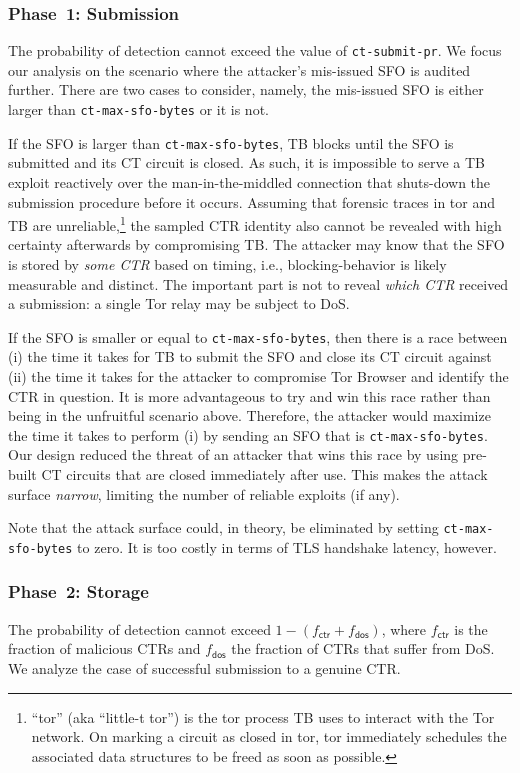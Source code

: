 \subsubsection{Phase~1: Submission} \label{sec:analysis:pr:phase1}
The probability of detection cannot exceed the value of \texttt{ct-submit-pr}.
We focus our analysis on the scenario where the
attacker's mis-issued SFO is audited further.  There are two cases to consider,
namely, the mis-issued SFO is either larger than \texttt{ct-max-sfo-bytes} or it
is not.

If the SFO is larger than \texttt{ct-max-sfo-bytes}, TB blocks until
the SFO is submitted and its CT circuit is closed.  As such, it is impossible to
serve a TB exploit reactively over the man-in-the-middled connection
that shuts-down the submission procedure before it occurs.  Assuming that
forensic traces in tor and TB are unreliable,\footnote{%
	``tor'' (aka ``little-t tor'') is the tor process TB uses to interact
        with the Tor network.
        On marking a circuit as closed in tor, tor immediately schedules the
	associated data structures to be freed as soon as possible.
} the sampled CTR identity also cannot be revealed with high certainty
afterwards by compromising TB.  The attacker may know that the SFO is
stored by \emph{some CTR} based on timing, i.e., blocking-behavior is likely
measurable and distinct.  The important part is not to reveal \emph{which CTR}
received a submission:  a single Tor relay may be subject to DoS.

If the SFO is smaller or equal to \texttt{ct-max-sfo-bytes}, then there is a
race between (i) the time it takes for TB to submit the SFO and close
its CT circuit against (ii) the time it takes for the attacker to compromise Tor
Browser and identify the CTR in question.  It is more advantageous to try and
win this race rather than being in the unfruitful scenario above.  Therefore,
the attacker would maximize the time it takes to perform (i) by sending an SFO
that is \texttt{ct-max-sfo-bytes}.  Our design reduced the threat of an attacker
that wins this race by using pre-built CT circuits that are closed immediately
after use.  This makes the attack surface \emph{narrow}, limiting the number of
reliable exploits (if any).

Note that the attack surface could, in theory, be eliminated by setting
\texttt{ct-max-sfo-bytes} to zero.  It is too costly in terms of TLS
handshake latency, however.

\subsubsection{Phase~2: Storage} \label{sec:analysis:pr:phase2}
The probability of detection cannot exceed $1-(f_{\mathsf{ctr}} +
f_{\mathsf{dos}})$, where $f_{\mathsf{ctr}}$ is the fraction of
malicious CTRs and $f_{\mathsf{dos}}$ the fraction of CTRs that suffer from
DoS.  We analyze the case of successful submission to a genuine CTR.

